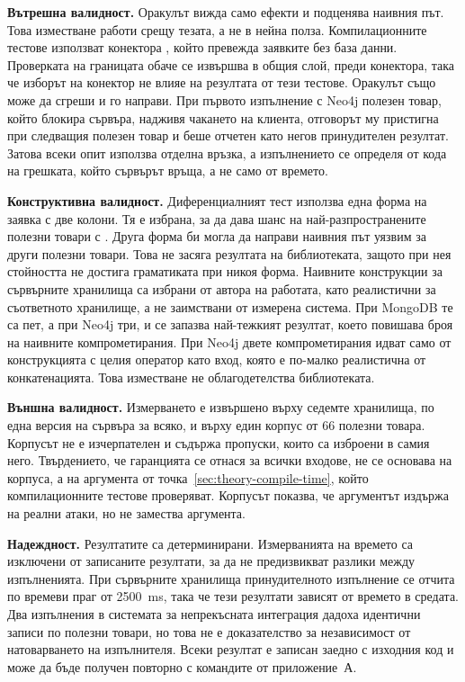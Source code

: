 \textbf{Вътрешна валидност.} Оракулът вижда само ефекти и подценява наивния път.
Това изместване работи срещу тезата, а не в нейна полза. Компилационните тестове
използват конектора , който превежда заявките без база данни.
Проверката на границата обаче се извършва в общия слой, преди конектора, така че
изборът на конектор не влияе на резултата от тези тестове. Оракулът също може да
сгреши и го направи. При първото изпълнение с Neo4j полезен товар, който блокира
сървъра, надживя чакането на клиента, отговорът му пристигна при следващия полезен
товар и беше отчетен като негов принудителен резултат. Затова всеки опит използва
отделна връзка, а изпълнението се определя от кода на грешката, който сървърът
връща, а не само от времето.

\textbf{Конструктивна валидност.} Диференциалният тест използва една форма на
заявка с две колони. Тя е избрана, за да дава шанс на най-разпространените
полезни товари с . Друга форма би могла да направи наивния път
уязвим за други полезни товари. Това не засяга резултата на библиотеката,
защото при нея стойността не достига граматиката при никоя форма. Наивните
конструкции за сървърните хранилища са избрани от автора на работата, като
реалистични за съответното хранилище, а не заимствани от измерена система. При
MongoDB те са пет, а при Neo4j три, и се запазва най-тежкият резултат, което повишава
броя на наивните компрометирания. При Neo4j двете компрометирания идват само от
конструкцията с целия оператор като вход, която е по-малко реалистична от
конкатенацията. Това изместване не облагодетелства библиотеката.

\textbf{Външна валидност.} Измерването е извършено върху седемте хранилища, по
една версия на сървъра за всяко, и върху един корпус от 66 полезни товара. Корпусът не е изчерпателен и съдържа пропуски, които са
изброени в самия него. Твърдението, че гаранцията се отнася за всички входове, не
се основава на корпуса, а на аргумента от точка~\ref{sec:theory-compile-time},
който компилационните тестове проверяват. Корпусът показва, че аргументът издържа
на реални атаки, но не замества аргумента.

\textbf{Надеждност.} Резултатите са детерминирани. Измерванията на времето са
изключени от записаните резултати, за да не предизвикват разлики между
изпълненията. При сървърните хранилища принудителното изпълнение се отчита по
времеви праг от 2500~ms, така че тези резултати зависят от времето в средата.
Два изпълнения в системата за непрекъсната интеграция дадоха идентични записи по
полезни товари, но това не е доказателство за независимост от натоварването на
изпълнителя. Всеки резултат е записан заедно с изходния код и може да бъде
получен повторно с командите от приложение~А.
